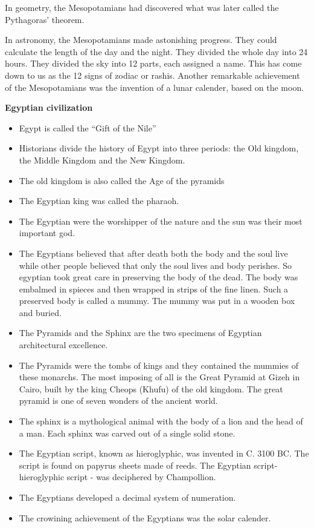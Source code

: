\documentclass[
  openany]{book}
\providecommand{\tightlist}{%
  \setlength{\itemsep}{0pt}\setlength{\parskip}{0pt}}
\begin{document}
In geometry, the Mesopotamians had discovered what was later called the Pythagoras' theorem.

In astronomy, the Mesopotamians made astonishing progress. They could calculate the length of the day and the night. They divided the whole day into 24 hours. They divided the sky into 12 parts, each assigned a name. This has come down to us as the 12 signs of zodiac or rashis. Another remarkable achievement of the Mesopotamians was the invention of a lunar calender, based on the moon.

\textbf{Egyptian civilization}

\begin{itemize}
\tightlist
\item
  Egypt is called the ``Gift of the Nile''
\item
  Historians divide the history of Egypt into three periods: the Old kingdom, the Middle Kingdom and the New Kingdom.
\item
  The old kingdom is also called the Age of the pyramids
\item
  The Egyptian king was called the pharaoh.
\item
  The Egyptian were the worshipper of the nature and the sun was their most important god.
\item
  The Egyptians believed that after death both the body and the soul live while other people believed that only the soul lives and body perishes. So egyptian took great care in preserving the body of the dead. The body was embalmed in spieces and then wrapped in strips of the fine linen. Such a preserved body is called a mummy. The mummy was put in a wooden box and buried.
\item
  The Pyramids and the Sphinx are the two specimens of Egyptian architectural excellence.
\item
  The Pyramids were the tombs of kings and they contained the mummies of these monarchs. The most imposing of all is the Great Pyramid at Gizeh in Cairo, built by the king Cheops (Khufu) of the old kingdom. The great pyramid is one of seven wonders of the ancient world.
\item
  The sphinx is a mythological animal with the body of a lion and the head of a man. Each sphinx was carved out of a single solid stone.
\item
  The Egyptian script, known as hieroglyphic, was invented in C. 3100 BC. The script is found on papyrus sheets made of reeds. The Egyptian script-hieroglyphic script - was deciphered by Champollion.
\item
  The Egyptians developed a decimal system of numeration.
\item
  The crowining achievement of the Egyptians was the solar calender.
\end{itemize}
\end{document}
